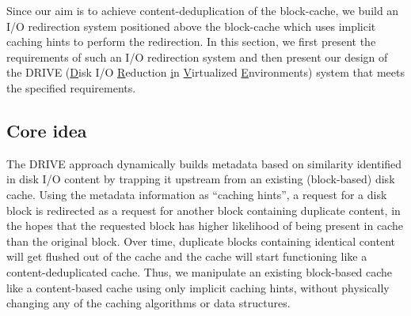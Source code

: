 
Since our aim is to achieve content-deduplication of the block-cache,
we build an I/O redirection system positioned above the block-cache
which uses implicit caching hints to perform the redirection.
In this section, we first present the requirements of such an I/O redirection 
system and then present our design of the DRIVE (\underline{D}isk I/O
\underline{R}eduction \underline{i}n \underline{V}irtualized 
\underline{E}nvironments) system that meets the specified
requirements.

\subsection{Core idea}
The DRIVE approach dynamically builds metadata based on
similarity identified in disk I/O content by trapping it
upstream from an existing (block-based) disk cache. Using
the metadata information as ``caching hints'', a request
for a disk block is redirected as a request for
another block containing duplicate content, in the hopes
that the requested block has higher likelihood of being
present in cache than the original block. Over time, duplicate
blocks containing identical content will get flushed out
of the cache and the cache will start functioning like a
content-deduplicated cache. Thus, we manipulate an existing
block-based cache like a content-based cache using only
implicit caching hints, without physically changing any
of the caching algorithms or data structures.

